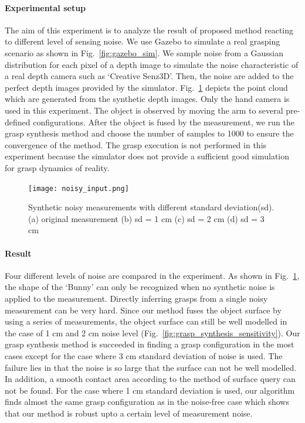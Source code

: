 \paragraph {Experimental setup} The aim of this experiment is to analyze the result of proposed method reacting to different level of sensing noise. We use Gazebo to simulate a real grasping scenario as shown in Fig.~\ref{fig:gazebo_sim}. We sample noise from a Gaussian distribution for each pixel of a depth image to simulate the noise characteristic of a real depth camera such as `Creative Senz3D'. Then, the noise are added to the perfect depth images provided by the simulator. Fig.~\ref{fig:noise} depicts the point cloud which are generated from the synthetic depth images. Only the hand camera is used in this experiment. The object is observed by moving the arm to several pre-defined configurations. After the object is fused by the measurement, we run the grasp synthesis method and choose the number of samples to 1000 to ensure the convergence of the method. The grasp execution is not performed in this experiment because the simulator does not provide a sufficient good simulation for grasp dynamics of reality. 
\begin{figure}[!htbp] 
\centering
\texttt{[image: noisy\_input.png]}%
\caption{Synthetic noisy measurements with different standard deviation(sd). (a) original measurement (b) sd = 1 cm (c) sd = 2 cm (d) sd = 3 cm}
\label{fig:noise}
\end{figure}	
\paragraph{Result} 
Four different levels of noise are compared in the experiment. As shown in Fig.~\ref{fig:noise}, the shape of the `Bunny' can only be recognized when no synthetic noise is applied to the measurement. Directly inferring grasps from a single noisy measurement can be very hard. Since our method fuses the object surface by using a series of measurements, the object surface can still be well modelled in the case of 1 cm and 2 cm noise level (Fig.~\ref{fig:grasp_synthesis_sensitivity}). Our grasp synthesis method is succeeded in finding a grasp configuration in the most cases except for the case where 3 cm standard deviation of noise is used.  The failure lies in that the noise is so large that the surface can not be well modelled. In addition, a smooth contact area according to the method of surface query can not be found. For the case where 1 cm standard deviation is used, our algorithm finds almost the same grasp configuration as in the noise-free case which shows that our method is robust upto a certain level of measurement noise. 


